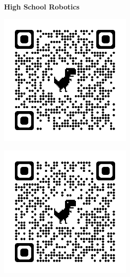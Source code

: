 \documentclass[letterpaper,10pt]{article}
\newcommand{\qrheader}[1]{
  \begin{center}
    \vspace{0.5cm}
    \textbf{#1}
  \end{center}
}
\begin{document}
  \begin{center}
    \qrheader{High School Robotics}
    \begin{minipage}{0.45\textwidth}
        \centering
        \includegraphics[width=6.5cm, height=6.5cm]{Figures/DEWBOTXVII.png}
        \label{fig:image5}
    \end{minipage}
    \hspace{0.05\textwidth}
    \begin{minipage}{0.45\textwidth}
        \centering
        \includegraphics[width=6.5cm, height=6.5cm]{Figures/VEX.png}
        \label{fig:image6}
    \end{minipage}
  \end{center}
\end{document}
